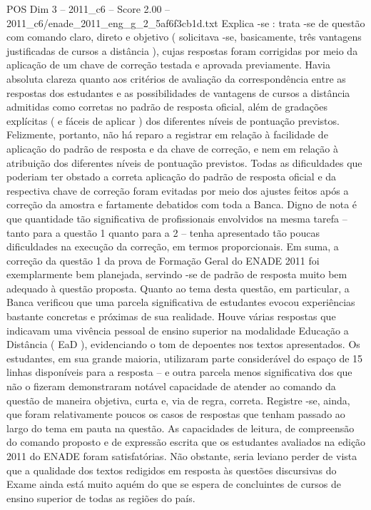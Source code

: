 \begin{textsample}{POS Dim 3 – 2011\_c6 – Score 2.00 – 2011\_c6/enade\_2011\_eng\_g\_2\_5af6f3cb1d.txt}
Explica -se : trata -se de questão com comando claro, direto e objetivo ( solicitava -se, basicamente, três vantagens justificadas de cursos a distância ), cujas respostas foram corrigidas por meio da aplicação de um chave de correção testada e aprovada previamente.
Havia absoluta clareza quanto aos critérios de avaliação da correspondência entre as respostas dos estudantes e as possibilidades de vantagens de cursos a distância admitidas como corretas no padrão de resposta oficial, além de gradações explícitas ( e fáceis de aplicar ) dos diferentes níveis de pontuação previstos.
Felizmente, portanto, não há reparo a registrar em relação à facilidade de aplicação do padrão de resposta e da chave de correção, e nem em relação à atribuição dos diferentes níveis de pontuação previstos.
Todas as dificuldades que poderiam ter obstado a correta aplicação do padrão de resposta oficial e da respectiva chave de correção foram evitadas por meio dos ajustes feitos após a correção da amostra e fartamente debatidos com toda a Banca.
Digno de nota é que quantidade tão significativa de profissionais envolvidos na mesma tarefa – tanto para a questão 1 quanto para a 2 – tenha apresentado tão poucas dificuldades na execução da correção, em termos proporcionais.
Em suma, a correção da questão 1 da prova de Formação Geral do ENADE 2011 foi exemplarmente bem planejada, servindo -se de padrão de resposta muito bem adequado à questão proposta.
Quanto ao tema desta questão, em particular, a Banca verificou que uma parcela significativa de estudantes evocou experiências bastante concretas e próximas de sua realidade.
Houve várias respostas que indicavam uma vivência pessoal de ensino superior na modalidade Educação a Distância ( EaD ), evidenciando o tom de depoentes nos textos apresentados.
Os estudantes, em sua grande maioria, utilizaram parte considerável do espaço de 15 linhas disponíveis para a resposta – e outra parcela menos significativa dos que não o fizeram demonstraram notável capacidade de atender ao comando da questão de maneira objetiva, curta e, via de regra, correta.
Registre -se, ainda, que foram relativamente poucos os casos de respostas que tenham passado ao largo do tema em pauta na questão.
As capacidades de leitura, de compreensão do comando proposto e de expressão escrita que os estudantes avaliados na edição 2011 do ENADE foram satisfatórias.
Não obstante, seria leviano perder de vista que a qualidade dos textos redigidos em resposta às questões discursivas do Exame ainda está muito aquém do que se espera de concluintes de cursos de ensino superior de todas as regiões do país.

\end{textsample}
